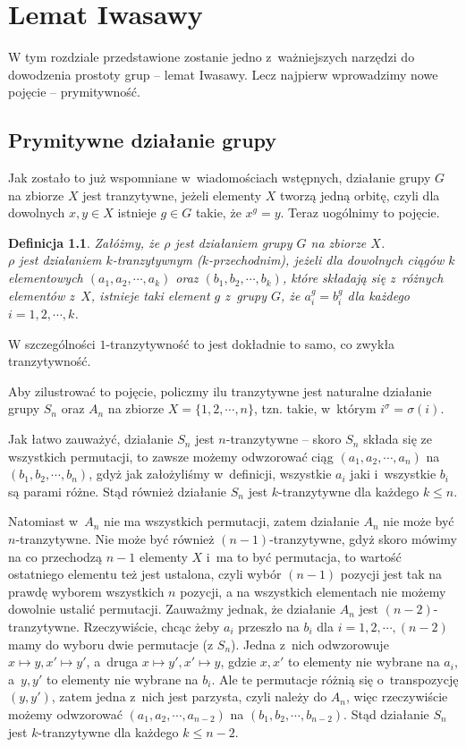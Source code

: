 \documentclass[licencjacka]{pracamgr}
\newtheorem{deff}{Definicja}[section]
\begin{document}
\chapter{Lemat Iwasawy}
W tym rozdziale przedstawione zostanie jedno z~ważniejszych narzędzi do dowodzenia prostoty grup -- lemat Iwasawy.
Lecz najpierw wprowadzimy nowe pojęcie --  prymitywność.

\section{Prymitywne działanie grupy}
Jak zostało to już wspomniane w~wiadomościach wstępnych, działanie grupy $G$ na zbiorze $X$ jest tranzytywne, 
jeżeli elementy $X$ tworzą jedną orbitę, czyli dla dowolnych $x, y \in X$ istnieje $g \in G$ takie, że $x^g = y$.
Teraz uogólnimy to pojęcie.

\begin{deff}
	Załóżmy, że $\rho$ jest działaniem grupy $G$ na zbiorze $X$. \\
	$\rho$ jest \emph{działaniem $k$-tranzytywnym ($k$-przechodnim)}, 
	jeżeli dla dowolnych ciągów $k$ elementowych $(a_1, a_2, \cdots, a_k)$ oraz $(b_1, b_2, \cdots, b_k)$, 
	które składają się z~różnych elementów z~$X$, istnieje taki element $g$ z~grupy $G$, że
	$a_i^g = b_i^g$ dla każdego $i = 1, 2, \cdots, k$.
\end{deff}
W szczególności $1$-tranzytywność to jest dokładnie to samo, co zwykła tranzytywność.

Aby zilustrować to pojęcie, policzmy ilu tranzytywne jest naturalne działanie grupy $S_n$ oraz $A_n$ na zbiorze $X = \{1, 2, \cdots, n\}$,
tzn. takie, w~którym $i^\sigma = \sigma(i)$.

Jak łatwo zauważyć, działanie $S_n$ jest $n$-tranzytywne -- skoro $S_n$ składa się ze wszystkich permutacji, 
to zawsze możemy odwzorować ciąg $(a_1, a_2, \cdots, a_n)$ na $(b_1, b_2, \cdots, b_n)$, gdyż jak założyliśmy w~definicji, 
wszystkie $a_i$ jaki i~wszystkie $b_i$ są parami różne.
Stąd również działanie $S_n$ jest $k$-tranzytywne dla każdego $k \le n$.

Natomiast w~$A_n$ nie ma wszystkich permutacji, zatem działanie $A_n$ nie może być $n$-tranzytywne.
Nie może być również $(n-1)$-tranzytywne, gdyż skoro mówimy na co przechodzą $n-1$ elementy $X$ i~ma to być permutacja,
to wartość ostatniego elementu też jest ustalona, czyli wybór $(n-1)$ pozycji jest tak na prawdę wyborem wszystkich $n$ pozycji, 
a na wszystkich elementach nie możemy dowolnie ustalić permutacji.
Zauważmy jednak, że działanie $A_n$ jest $(n-2)$-tranzytywne. 
Rzeczywiście, chcąc żeby $a_i$ przeszło na $b_i$ dla $i = 1, 2, \cdots, (n-2)$ mamy do wyboru dwie permutacje (z $S_n$).
Jedna z~nich odwzorowuje $x \mapsto y, x' \mapsto y'$, a~druga $x \mapsto y', x' \mapsto y$, 
gdzie $x, x'$ to elementy nie wybrane na $a_i$, a~$y, y'$ to elementy nie wybrane na $b_i$. 
Ale te permutacje różnią się o~transpozycję $(y, y')$, zatem jedna z~nich jest parzysta, czyli należy do $A_n$,
więc rzeczywiście możemy odwzorować $(a_1, a_2, \cdots, a_{n-2})$ na $(b_1, b_2, \cdots, b_{n-2})$.
Stąd działanie $S_n$ jest $k$-tranzytywne dla każdego $k \le n-2$.
\end{document}

